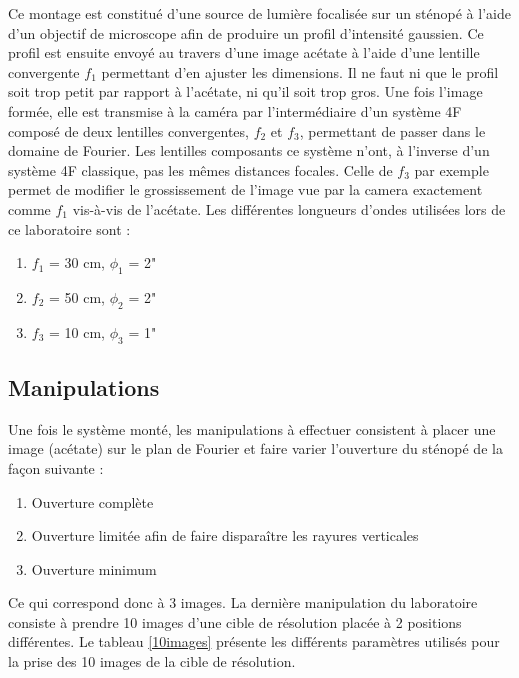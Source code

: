 \documentclass[11pt,letterpaper]{article}
\begin{document}
Ce montage est constitué d'une source de lumière focalisée sur un sténopé à l'aide d'un objectif de microscope afin de produire un profil d'intensité gaussien. Ce profil est ensuite envoyé au travers d'une image acétate à l'aide d'une lentille convergente $f_1$ permettant d'en ajuster les dimensions. Il ne faut ni que le profil soit trop petit par rapport à l'acétate, ni qu'il soit trop gros. Une fois l'image formée, elle est transmise à la caméra par l'intermédiaire d'un système 4F composé de deux lentilles convergentes, $f_2$ et $f_3$, permettant de passer dans le domaine de Fourier. Les lentilles composants ce système n'ont, à l'inverse d'un système 4F classique, pas les mêmes distances focales. Celle de $f_3$ par exemple permet de modifier le grossissement de l'image vue par la camera exactement comme $f_1$ vis-à-vis de l'acétate. Les différentes longueurs d'ondes utilisées lors de ce laboratoire sont : 

\begin{enumerate}
    \item $f_1$ = 30 cm, $\phi_1$ = 2" \\
    \item $f_2$ = 50 cm, $\phi_2$ = 2" \\
    \item $f_3$ = 10 cm, $\phi_3$ = 1" \\
\end{enumerate}

\subsection{Manipulations}

Une fois le système monté, les manipulations à effectuer consistent à placer une image (acétate) sur le plan de Fourier et faire varier l'ouverture du sténopé de la façon suivante : 

\begin{enumerate}
    \item Ouverture complète \\
    \item Ouverture limitée afin de faire disparaître les rayures verticales \\
    \item Ouverture minimum \\
\end{enumerate}

Ce qui correspond donc à 3 images. La dernière manipulation du laboratoire consiste à prendre 10 images d'une cible de résolution placée à 2 positions différentes. Le tableau \ref{10images} présente les différents paramètres utilisés pour la prise des 10 images de la cible de résolution. 
\end{document}
